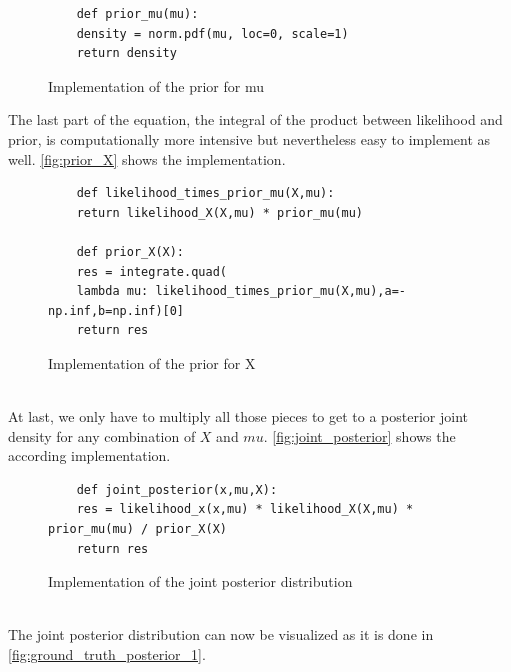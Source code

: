 \documentclass{article}
\begin{document}
\begin{figure}[h]
	\begin{lstlisting}
	def prior_mu(mu):
	density = norm.pdf(mu, loc=0, scale=1)
	return density
	\end{lstlisting}
	\caption{Implementation of the prior for mu}
	\label{fig:prior_mu}
\end{figure}
The last part of the equation, the integral of the product between likelihood and prior, is computationally more intensive but nevertheless easy to implement as well. \autoref{fig:prior_X} shows the implementation.
\begin{figure}[h]
	\begin{lstlisting}
	def likelihood_times_prior_mu(X,mu):
	return likelihood_X(X,mu) * prior_mu(mu)
	
	def prior_X(X):
	res = integrate.quad(
	lambda mu: likelihood_times_prior_mu(X,mu),a=-np.inf,b=np.inf)[0]
	return res
	\end{lstlisting}
	\caption{Implementation of the prior for X}
	\label{fig:prior_X}
\end{figure}
\\
At last, we only have to multiply all those pieces to get to a posterior joint density for any combination of $X$ and $mu$. \autoref{fig:joint_posterior} shows the according implementation.
\begin{figure}[h]
	\begin{lstlisting}
	def joint_posterior(x,mu,X):
	res = likelihood_x(x,mu) * likelihood_X(X,mu) * prior_mu(mu) / prior_X(X)
	return res
	\end{lstlisting}
	\caption{Implementation of the joint posterior distribution}
	\label{fig:joint_posterior}
\end{figure}
\\
The joint posterior distribution can now be visualized as it is done in \autoref{fig:ground_truth_posterior_1}.
\end{document}
